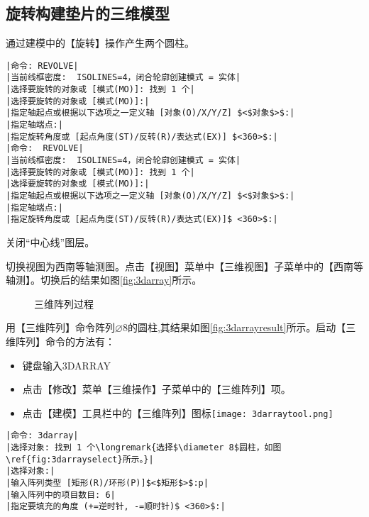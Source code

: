 \subsection{旋转构建垫片的三维模型}
\begin{procedure}
\item 通过建模中的【旋转】操作产生两个圆柱。
\begin{lstlisting}
|命令: REVOLVE|
|当前线框密度:  ISOLINES=4，闭合轮廓创建模式 = 实体|
|选择要旋转的对象或 [模式(MO)]: 找到 1 个|
|选择要旋转的对象或 [模式(MO)]:|
|指定轴起点或根据以下选项之一定义轴 [对象(O)/X/Y/Z] $<$对象$>$:|
|指定轴端点:|
|指定旋转角度或 [起点角度(ST)/反转(R)/表达式(EX)] $<360>$:|
|命令:  REVOLVE|
|当前线框密度:  ISOLINES=4，闭合轮廓创建模式 = 实体|
|选择要旋转的对象或 [模式(MO)]: 找到 1 个|
|选择要旋转的对象或 [模式(MO)]:|
|指定轴起点或根据以下选项之一定义轴 [对象(O)/X/Y/Z] $<$对象$>$:|
|指定轴端点:|
|指定旋转角度或 [起点角度(ST)/反转(R)/表达式(EX)]$ <360>$:|
\end{lstlisting}
\item 关闭“中心线”图层。
\item 切换视图为西南等轴测图。点击【视图】菜单中【三维视图】子菜单中的【西南等轴测】。切换后的结果如图\ref{fig:3darray}所示。
\begin{figure}[htbp]
\centering
{}\hspace{30pt}
\hspace{30pt}
\caption{三维阵列过程}
\end{figure}
\item 用【三维阵列】命令阵列$\diameter 8$的圆柱,其结果如图\ref{fig:3darrayresult}所示。启动【三维阵列】命令的方法有：
\begin{itemize}
\item 键盘输入3DARRAY
\item 点击【修改】菜单【三维操作】子菜单中的【三维阵列】项。
\item 点击【建模】工具栏中的【三维阵列】图标\texttt{[image: 3darraytool.png]}
\end{itemize}
\begin{lstlisting}
|命令: 3darray|
|选择对象: 找到 1 个\longremark{选择$\diameter 8$圆柱，如图\ref{fig:3darrayselect}所示。}|
|选择对象:|
|输入阵列类型 [矩形(R)/环形(P)]$<$矩形$>$:p|
|输入阵列中的项目数目: 6|
|指定要填充的角度 (+=逆时针, -=顺时针)$ <360>$:|

\end{lstlisting}
\end{procedure}
